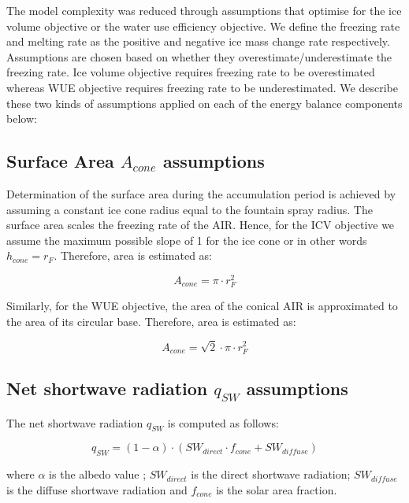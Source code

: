 \documentclass[tc, manuscript]{copernicus}
\begin{document}
The model complexity was reduced through assumptions that optimise for the ice volume objective or the water use
efficiency objective. We define the freezing rate and melting rate as the positive and negative ice mass change
rate respectively. Assumptions are chosen based on whether they overestimate/underestimate the freezing rate.
Ice volume objective requires freezing rate to be overestimated whereas WUE objective requires freezing rate to
be underestimated. We describe these two kinds of assumptions applied on each of the energy balance components
below: 

\subsection{Surface Area $A_{cone}$ assumptions}

Determination of the surface area during the accumulation period is achieved by assuming a constant ice cone
radius equal to the fountain spray radius. The surface area scales the freezing rate of the AIR. Hence, for the
ICV objective we assume the maximum possible slope of 1 for the ice cone or in other words $h_{cone} = r_{F}$.
Therefore, area is estimated as:  

\begin{equation} A_{cone} =\pi \cdot r_{F}^2 \label{eq:Area} \end{equation}

Similarly, for the WUE objective, the area of the conical AIR is approximated to the area of its circular
base. Therefore, area is estimated as:

\begin{equation} A_{cone} =\sqrt{2} \cdot \pi \cdot r_{F}^2 \label{eq:Area} \end{equation}

\subsection{Net shortwave radiation \texorpdfstring{$q_{SW}$}{Lg} assumptions}
\label{sec:SW}

The net shortwave radiation $q_{SW}$ is computed as follows:

\begin{equation} 
q_{SW} = (1- \alpha) \cdot ( SW_{direct} \cdot f_{cone} + SW_{diffuse})
\label{eqn:SW} 
\end{equation}

where $\alpha$ is the albedo value ; $SW_{direct}$ is the direct shortwave radiation; $SW_{diffuse}$ is the
diffuse shortwave radiation and $f_{cone}$ is the solar area fraction.
\end{document}
